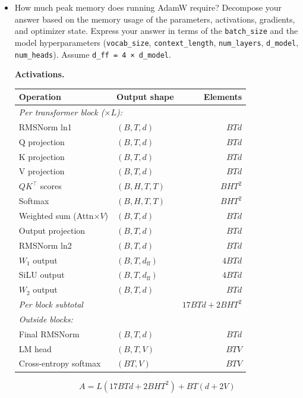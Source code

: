 \documentclass[letterpaper]{article}
\begin{document}
\begin{itemize}
	\item[(a)] How much peak memory does running AdamW require? Decompose your answer based on the memory usage of the parameters, activations, gradients, and optimizer state. Express your answer in terms of the \texttt{batch\_size} and the model hyperparameters (\texttt{vocab\_size}, \texttt{context\_length}, \texttt{num\_layers}, \texttt{d\_model}, \texttt{num\_heads}). Assume \texttt{d\_ff = 4 × d\_model}.

	\textbf{Activations.}

	\begin{table}[H]
	\centering
	\begin{tabular}{llr}
	\hline
	\textbf{Operation} & \textbf{Output shape} & \textbf{Elements} \\
	\hline
	\multicolumn{3}{l}{\textit{Per transformer block ($\times L$):}} \\
	\quad RMSNorm ln1 & $(B,T,d)$ & $BTd$ \\
	\quad Q projection & $(B,T,d)$ & $BTd$ \\
	\quad K projection & $(B,T,d)$ & $BTd$ \\
	\quad V projection & $(B,T,d)$ & $BTd$ \\
	\quad $QK^\top$ scores & $(B,H,T,T)$ & $BHT^2$ \\
	\quad Softmax & $(B,H,T,T)$ & $BHT^2$ \\
	\quad Weighted sum (Attn$\times V$) & $(B,T,d)$ & $BTd$ \\
	\quad Output projection & $(B,T,d)$ & $BTd$ \\
	\quad RMSNorm ln2 & $(B,T,d)$ & $BTd$ \\
	\quad $W_1$ output & $(B,T,d_\text{ff})$ & $4BTd$ \\
	\quad SiLU output & $(B,T,d_\text{ff})$ & $4BTd$ \\
	\quad $W_2$ output & $(B,T,d)$ & $BTd$ \\
	\quad \textit{Per block subtotal} & & $17BTd + 2BHT^2$ \\
	\hline
	\multicolumn{3}{l}{\textit{Outside blocks:}} \\
	\quad Final RMSNorm & $(B,T,d)$ & $BTd$ \\
	\quad LM head & $(B,T,V)$ & $BTV$ \\
	\quad Cross-entropy softmax & $(BT,V)$ & $BTV$ \\
	\hline
	\end{tabular}
	\end{table}
	\[
		A = L(17BTd + 2BHT^2) + BT(d + 2V)
	\]


\end{itemize}
\end{document}
